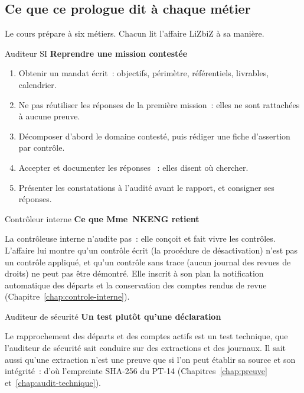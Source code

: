 \subsection{Ce que ce prologue dit à chaque métier}

Le cours prépare à six métiers. Chacun lit l'affaire LiZbiZ à sa manière.

\begin{boxmetier}{Auditeur SI}
\textbf{Reprendre une mission contestée}
\begin{enumerate}
    \item Obtenir un mandat écrit~: objectifs, périmètre, référentiels,
          livrables, calendrier.
    \item Ne pas réutiliser les réponses de la première mission~: elles ne
          sont rattachées à aucune preuve.
    \item Décomposer d'abord le domaine contesté, puis rédiger une fiche
          d'assertion par contrôle.
    \item Accepter et documenter les réponses \NEK{}~: elles disent où
          chercher.
    \item Présenter les constatations à l'audité avant le rapport, et
          consigner ses réponses.
\end{enumerate}
\end{boxmetier}

\begin{boxmetier}{Contrôleur interne}
\textbf{Ce que Mme~NKENG retient}

La contrôleuse interne n'audite pas~: elle conçoit et fait vivre les
contrôles. L'affaire lui montre qu'un contrôle écrit (la procédure de
désactivation) n'est pas un contrôle appliqué, et qu'un contrôle sans trace
(aucun journal des revues de droits) ne peut pas être démontré. Elle
inscrit à son plan la notification automatique des départs et la
conservation des comptes rendus de revue (Chapitre~\ref{chap:controle-interne}).
\end{boxmetier}

\begin{boxmetier}{Auditeur de sécurité}
\textbf{Un test plutôt qu'une déclaration}

Le rapprochement des départs et des comptes actifs est un test technique,
que l'auditeur de sécurité sait conduire sur des extractions et des
journaux. Il sait aussi qu'une extraction n'est une preuve que si l'on peut
établir sa source et son intégrité~: d'où l'empreinte SHA-256 du PT-14
(Chapitres~\ref{chap:preuve} et~\ref{chap:audit-technique}).
\end{boxmetier}

